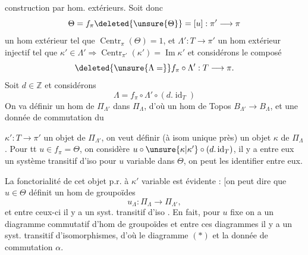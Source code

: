 construction par hom. extérieurs. Soit donc
\[
\Theta=f_\pi\deleted{\unsure{\Theta}}=[u]:\pi'\longrightarrow\pi
\]
un hom extérieur tel que \(\operatorname{Centr}_\pi(\Theta)=1\),
et \(\Lambda':T\longrightarrow\pi'\) un hom extérieur injectif
tel que \(\kappa'\in\Lambda'\Rightarrow\operatorname{Centr}_{\pi'}(\kappa')=\operatorname{Im}\kappa'\)
et considérons le composé
\[
\deleted{\unsure{\Lambda=}}f_\pi\circ\Lambda':T\longrightarrow\pi.
\]
Soit \(d\in\mathbb Z\) et considérons
\[
\Lambda=f_\pi\circ\Lambda'\circ(d.\operatorname{id}_T)
\]
On va définir un hom de \(\Pi_{\Lambda'}\) dans \(\Pi_\Lambda\),
d'où un hom de Topos \(B_{\Lambda'}\longrightarrow B_\Lambda\),
et une donnée de commutation \inserted{\(\alpha\)} du

 \(\kappa':T\longrightarrow\pi'\) un objet de \(\Pi_{\Lambda'}\),
on veut définir (à isom unique près) un
objet \(\kappa\) de \(\Pi_\Lambda\). Pour tt \(u\in f_\pi=\Theta\),
on considère \(u\circ\unsure{\kappa|\kappa'}\circ(d.\operatorname{id}_T)\), il y a entre eux
un système transitif d'iso pour \(u\) variable
dans \(\Theta\), on peut les identifier entre eux.

La fonctorialité de cet objet p.r. à
\(\kappa'\) variable est évidente : [on peut dire que
\(u\in\Theta\) définit un hom de groupoïdes
\[
u_\Lambda:\Pi_\Lambda\longrightarrow\Pi_{\Lambda'},
\]
et entre ceux-ci
il y a un syst. transitif d'iso \unsure{\}}. En fait,
pour \(u\) fixe on a un  diagramme
commutatif d'hom de groupoïdes
et entre ces diagrammes il y a un
syst. transitif d'isomorphismes, d'où
le diagramme \((*)\) et la donnée
de commutation \(\alpha\).

